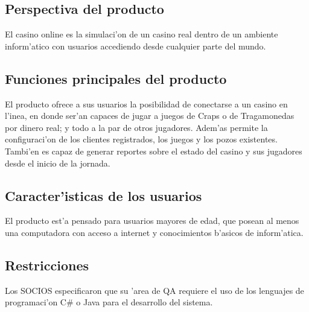  \subsection{ Perspectiva del producto	}
El casino online es la simulaci'on de un casino real dentro de un ambiente inform'atico con usuarios accediendo desde cualquier parte del mundo.

 \subsection{ Funciones principales del producto }
El producto ofrece a sus usuarios la posibilidad de conectarse a un casino en l'inea, en donde ser'an capaces de jugar a juegos de Craps o de Tragamonedas por dinero real; y todo a la par de otros jugadores. Adem'as permite la configuraci'on de los clientes registrados, los juegos y los pozos existentes. Tambi'en es capaz de generar reportes sobre el estado del casino y sus jugadores desde el inicio de la jornada.

 \subsection{ Caracter'isticas de los usuarios }
El producto est'a pensado para usuarios mayores de edad, que posean al menos una computadora con acceso a internet y conocimientos b'asicos de inform'atica.

 \subsection{ Restricciones }
Los SOCIOS especificaron que su 'area de QA requiere el uso de los lenguajes de programaci'on C\# o Java para el desarrollo del sistema.

